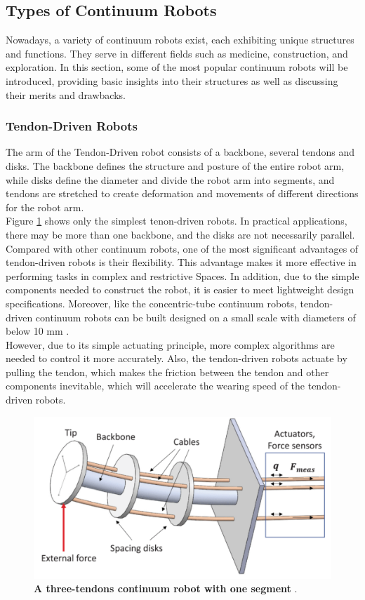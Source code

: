 \subsection{Types of Continuum Robots}
Nowadays, a variety of continuum robots exist, each exhibiting unique structures and functions. They serve in different fields 
such as medicine, construction, and exploration. In this section, some of the most popular continuum robots will be introduced, 
providing basic insights into their structures as well as discussing their merits and drawbacks. \\
\vspace{-10mm}
\subsubsection{Tendon-Driven Robots}
The arm of the Tendon-Driven robot consists of a backbone, several tendons and disks. The backbone defines the structure and 
posture of the entire robot arm, while disks define the diameter and divide the robot arm into segments, and tendons are 
stretched to create deformation and movements of different directions for the robot arm. \\
Figure \ref{fig:3tendon_1segment_CR} shows only the simplest tenon-driven robots. In practical applications, there 
may be more than one backbone, and the disks are not necessarily parallel. \\
Compared with other continuum robots, one of the most significant advantages of tendon-driven robots is their flexibility. 
This advantage makes it more effective in performing tasks in complex and restrictive Spaces. In addition, due to the simple 
components needed to construct the robot, it is easier to meet lightweight design specifications. Moreover, like the 
concentric-tube continuum robots, tendon-driven continuum robots can be built designed on a small scale with diameters of 
below 10 mm \cite{amanov2021tendon}. \\
However, due to its simple actuating principle, more complex algorithms are needed to control it more accurately. Also, the 
tendon-driven robots actuate by pulling the tendon, which makes the friction between the tendon and other components inevitable, 
which will accelerate the wearing speed of the tendon-driven robots.
\begin{figure}[H] %
    \centering
    \captionsetup{labelsep=colon}
    \includegraphics[width=.7\textwidth]{Image/LR/3tendon_1segment_CR.PNG} 
    \caption[A three-tendons continuum robot with one segment]
    {\centering \textbf{A three-tendons continuum robot with one segment} \cite{3tendon_1segment_CR}.}
    \label{fig:3tendon_1segment_CR}
\end{figure}
